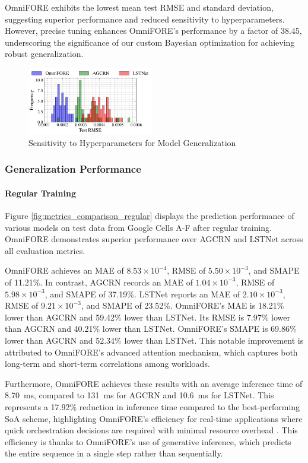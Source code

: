 \documentclass{ieeetmlcn}
\begin{document}
OmniFORE exhibits the lowest mean test RMSE and standard deviation, suggesting superior performance and reduced sensitivity to hyperparameters. However, precise tuning enhances OmniFORE's performance by a factor of 38.45, underscoring the significance of our custom Bayesian optimization for achieving robust generalization.

\begin{figure}\centering%
\centering
\includegraphics[width=0.49\textwidth]{img/test_rmse_distribution_histogram.pdf}
\caption{Sensitivity to Hyperparameters for Model Generalization}
\label{fig:test_rmse_distribution_histogram}
\end{figure}

\subsubsection{\textbf{Generalization Performance}}
\label{sec: Evaluation - Generalization Performance}
\paragraph*{Regular Training}
Figure \ref{fig:metrics_comparison_regular} displays the prediction performance of various models on test data from Google Cells A-F after regular training. OmniFORE demonstrates superior performance over AGCRN and LSTNet across all evaluation metrics.

OmniFORE achieves an MAE of $8.53 \times 10^{-4}$, RMSE of $5.50 \times 10^{-3}$, and SMAPE of 11.21\%. In contrast, AGCRN records an MAE of $1.04 \times 10^{-3}$, RMSE of $5.98 \times 10^{-3}$, and SMAPE of 37.19\%. LSTNet reports an MAE of $2.10 \times 10^{-3}$, RMSE of $9.21 \times 10^{-3}$, and SMAPE of 23.52\%. OmniFORE's MAE is 18.21\% lower than AGCRN and 59.42\% lower than LSTNet. Its RMSE is 7.97\% lower than AGCRN and 40.21\% lower than LSTNet. OmniFORE's SMAPE is 69.86\% lower than AGCRN and 52.34\% lower than LSTNet. This notable improvement is attributed to OmniFORE's advanced attention mechanism, which captures both long-term and short-term correlations among workloads.

Furthermore, OmniFORE achieves these results with an average inference time of \SI{8.70}{\milli\second}, compared to \SI{131}{\milli\second} for AGCRN and \SI{10.6}{\milli\second} for LSTNet. This represents a 17.92\% reduction in inference time compared to the best-performing SoA scheme, highlighting OmniFORE's efficiency for real-time applications where quick orchestration decisions are required with minimal resource overhead \cite{9500858, 8334540}. This efficiency is thanks to OmniFORE's use of generative inference, which predicts the entire sequence in a single step rather than sequentially.
\end{document}
